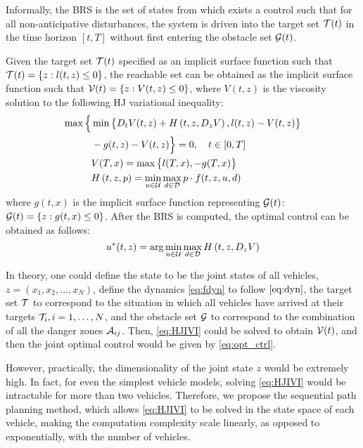 Informally, the BRS is the set of states from which exists a control such that for all non-anticipative disturbances, the system is driven into the target set $\mathcal{T}(t)$ in the time horizon $[t, T]$ without first entering the obstacle set $\mathcal{G}(t)$.

Given the target set $\mathcal{T}(t)$ specified as an implicit surface function such that $\mathcal{T}(t) = \{z: l(t, z) \le 0\}$, the reachable set can be obtained as the implicit surface function such that $\mathcal{V}(t) = \{z: V(t, z) \le 0\}$, where $V(t, z)$ is the viscosity solution \cite{Crandall83} to the following HJ variational inequality:
%
\begin{equation}
\label{eq:HJIVI}
\begin{aligned}
\max\Big\{&\min\big\{D_t V(t, z) + H\left(t, z, D_z V\right), l(t,z) - V(t, z)\big\}\\
& -g(t, z) - V(t, z)\Big\} = 0, \quad t\in[0,T]\\
&V(T, x) = \max\big\{l(T, x), -g(T, x)\big\} \\
&H\left(t, z, p\right) = \min_{u \in \mathcal{U}} \max_{d \in \mathcal{D}} p \cdot f(t, z, u, d)
\end{aligned}
\end{equation}
%
\noindent where $g(t, x)$ is the implicit surface function representing $\mathcal{G}(t)$: $\mathcal{G}(t) = \{z: g(t, x) \le 0\}$. After the BRS is computed, the optimal control can be obtained as follows:
%
\begin{equation}
\label{eq:opt_ctrl}
u^*(t, z) = \arg \min_{u \in \mathcal{U}} \max_{d \in \mathcal{D}} H\left(t, z, D_z V\right)
\end{equation}

In theory, one could define the state to be the joint states of all vehicles, $z = (x_1, x_2, \ldots, x_N)$, define the dynamics \eqref{eq:fdyn} to follow $\eqref{eq:dyn}$, the target set $\mathcal{T}$ to correspond to the situation in which all vehicles have arrived at their targets $\mathcal{T}_i, i = 1, \ldots, N$, and the obstacle set $\mathcal{G}$ to correspond to the combination of all the danger zones $\mathcal{A}_{ij}$. Then, \eqref{eq:HJIVI} could be solved to obtain $\mathcal{V}(t)$, and then the joint optimal control would be given by \eqref{eq:opt_ctrl}.

However, practically, the dimensionality of the joint state $z$ would be extremely high. In fact, for even the simplest vehicle models, solving \eqref{eq:HJIVI} would be intractable for more than two vehicles. Therefore, we propose the sequential path planning method, which allows \eqref{eq:HJIVI} to be solved in the state space of each vehicle, making the computation complexity scale linearly, as opposed to exponentially, with the number of vehicles.

